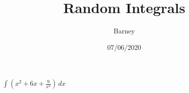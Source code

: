 \documentclass[11pt,a4paper]{article}
\title{Random Integrals}
\author{Barney}
\date{07/06/2020}
\begin{document}
\begin{titlepage}
 \maketitle
 \end{titlepage}
$\int \left(x^{2} + 6 x + \frac{9}{x^{3}}\right)\, dx$
\end{document}

